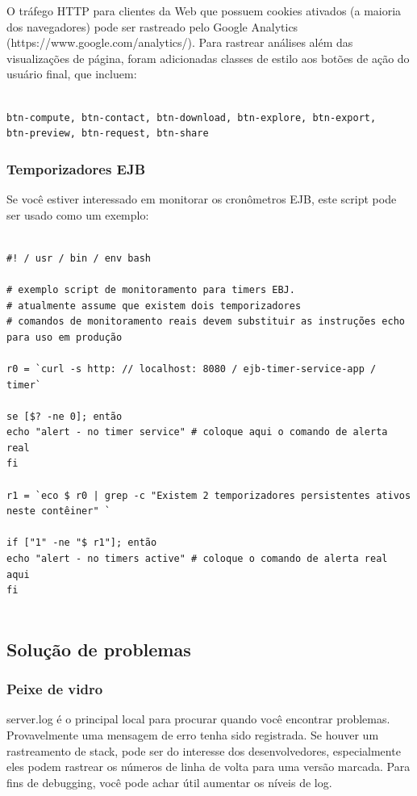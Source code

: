 \documentclass[12pt,hidelinks]{article}
\begin{document}
\qquad O tráfego HTTP para clientes da Web que possuem cookies ativados (a maioria dos navegadores) pode ser rastreado pelo Google Analytics (https://www.google.com/analytics/). Para rastrear análises além das visualizações de página, foram adicionadas classes de estilo aos botões de ação do usuário final, que incluem:

\begin{verbatim}

btn-compute, btn-contact, btn-download, btn-explore, btn-export, 
btn-preview, btn-request, btn-share

\end{verbatim}

\subsubsection{Temporizadores EJB}

\qquad Se você estiver interessado em monitorar os cronômetros EJB, este script pode ser usado como um exemplo:

\begin{verbatim}

#! / usr / bin / env bash

# exemplo script de monitoramento para timers EBJ.
# atualmente assume que existem dois temporizadores
# comandos de monitoramento reais devem substituir as instruções echo
para uso em produção

r0 = `curl -s http: // localhost: 8080 / ejb-timer-service-app / timer`

se [$? -ne 0]; então
echo "alert - no timer service" # coloque aqui o comando de alerta real
fi

r1 = `eco $ r0 | grep -c "Existem 2 temporizadores persistentes ativos
neste contêiner" `

if ["1" -ne "$ r1"]; então
echo "alert - no timers active" # coloque o comando de alerta real aqui
fi
 
\end{verbatim}
 
\subsection{Solução de problemas}

\subsubsection{Peixe de vidro}

\qquad server.log é o principal local para procurar quando você encontrar problemas. Provavelmente uma mensagem de erro tenha sido registrada. Se houver um rastreamento de stack, pode ser do interesse dos desenvolvedores, especialmente eles podem rastrear os números de linha de volta para uma versão marcada. Para fins de debugging, você pode achar útil aumentar os níveis de log.
\end{document}
